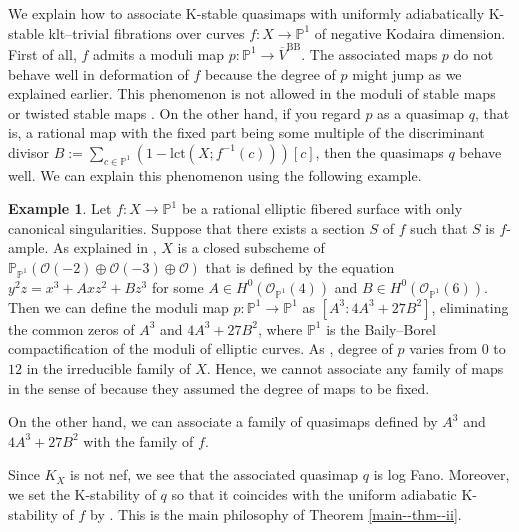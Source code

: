\documentclass[12pt,twoside]{amsart}
\theoremstyle{definition}
\newtheorem{ex}[thm]{Example}
\begin{document}
 







We explain how to associate K-stable quasimaps with uniformly adiabatically K-stable klt--trivial fibrations over curves $f\colon X\to \mathbb{P}^1$ of negative Kodaira dimension.
First of all, $f$ admits a moduli map $p\colon \mathbb{P}^1\to \overline{V}^{\mathrm{BB}}$. 
The associated maps $p$ do not behave well in deformation of $f$ because the degree of $p$ might jump as we explained earlier.
This phenomenon is not allowed in the moduli of stable maps \cite{K,FP} or twisted stable maps \cite{AV2,AV}. 
On the other hand, if you regard $p$ as a quasimap $q$, that is, a rational map with the fixed part being some multiple of the discriminant divisor $B:=\sum_{c\in\mathbb{P}^1}(1-\mathrm{lct}(X;f^{-1}(c)))[c]$, then the quasimaps $q$ behave well.
We can explain this phenomenon using the following example.

\begin{ex}
Let $f\colon X\to \mathbb{P}^1$ be a rational elliptic fibered surface with only canonical singularities.
Suppose that there exists a section $S$ of $f$ such that $S$ is $f$-ample.
As explained in \cite{Mi}, $X$ is a closed subscheme of $\mathbb{P}_{\mathbb{P}^1}(\mathcal{O}(-2)\oplus\mathcal{O}(-3)\oplus\mathcal{O})$ that is defined by the equation $y^2z=x^3+Axz^2+Bz^3$ for some $A\in H^0(\mathcal{O}_{\mathbb{P}^1}(4))$ and $B\in H^0(\mathcal{O}_{\mathbb{P}^1}(6))$.
Then we can define the moduli map $p\colon \mathbb{P}^1\to\mathbb{P}^1$ as $[A^3:4A^3+27B^2]$, eliminating the common zeros of $A^3$ and $4A^3+27B^2$, where $\mathbb{P}^1$ is the Baily--Borel compactification of the moduli of elliptic curves.
As \cite[Table 6.1]{Mi}, degree of $p$ varies from $0$ to $12$ in the irreducible family of $X$.
Hence, we cannot associate any family of maps in the sense of \cite{K,FP,AV} because they assumed the degree of maps to be fixed.

On the other hand, we can associate a family of quasimaps defined by $A^3$ and $4A^3+27B^2$ with the family of $f$. 
\end{ex}

Since $K_X$ is not nef, we see that the associated quasimap $q$ is log Fano. 
Moreover, we set the K-stability of $q$ so that it coincides with the uniform adiabatic K-stability of $f$ by \cite[Theorem 1.1]{Hat}.
This is the main philosophy of Theorem \ref{main--thm--ii}.
\end{document}
